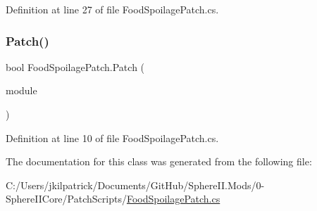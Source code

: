 Definition at line 27 of file Food\+Spoilage\+Patch.\+cs.

\mbox{\label{class_food_spoilage_patch_a68168b94551e581dc9e44fe4c0f5354c}} 
\subsubsection{\texorpdfstring{Patch()}{Patch()}}
{\footnotesize\ttfamily bool Food\+Spoilage\+Patch.\+Patch (\begin{DoxyParamCaption}\item[{Module\+Definition}]{module }\end{DoxyParamCaption})}



Definition at line 10 of file Food\+Spoilage\+Patch.\+cs.



The documentation for this class was generated from the following file\+:\begin{DoxyCompactItemize}
\item 
C\+:/\+Users/jkilpatrick/\+Documents/\+Git\+Hub/\+Sphere\+I\+I.\+Mods/0-\/\+Sphere\+I\+I\+Core/\+Patch\+Scripts/\mbox{\hyperlink{_food_spoilage_patch_8cs}{Food\+Spoilage\+Patch.\+cs}}\end{DoxyCompactItemize}
